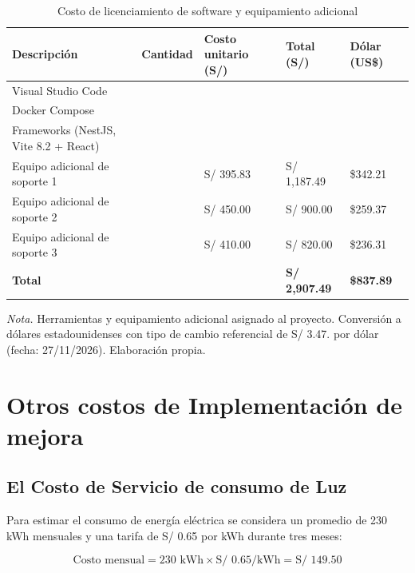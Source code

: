 \begin{table}[htbp]
\centering
\caption{Costo de licenciamiento de software y equipamiento adicional}
\label{tab:licenciamiento_adicional}
\begin{tabularx}{\textwidth}{@{}>{\raggedright\arraybackslash}X >{\centering\arraybackslash}p{1.6cm} >{\raggedleft\arraybackslash}p{2.6cm} >{\raggedleft\arraybackslash}p{2.3cm} >{\raggedleft\arraybackslash}p{2.1cm}@{}}
\toprule
\textbf{Descripción} & \textbf{Cantidad} & \textbf{Costo unitario (S/)} & \textbf{Total (S/)} & \textbf{Dólar (US\$)} \\
\midrule
Visual Studio Code & 7 & 0.00 & 0.00 & 0.00 \\
Docker Compose & 2 & 0.00 & 0.00 & 0.00 \\
Frameworks (NestJS, Vite 8.2 + React) & 7 & 0.00 & 0.00 & 0.00 \\
Equipo adicional de soporte 1 & 3 & S/ 395.83 & S/ 1,187.49 & \$342.21 \\
Equipo adicional de soporte 2 & 2 & S/ 450.00 & S/ 900.00 & \$259.37 \\
Equipo adicional de soporte 3 & 2 & S/ 410.00 & S/ 820.00 & \$236.31 \\
\midrule
\textbf{Total} & & & \textbf{S/ 2,907.49} & \textbf{\$837.89} \\
\bottomrule
\end{tabularx}
\par\vspace{0.3em}
\raggedright\footnotesize{\textit{Nota.} Herramientas y equipamiento adicional asignado al proyecto. Conversión a dólares estadounidenses con tipo de cambio referencial de S/ 3.47. por dólar (fecha: 27/11/2026). Elaboración propia.}
\end{table}

\section{Otros costos de Implementación de mejora}

\subsection{El Costo de Servicio de consumo de Luz}

Para estimar el consumo de energía eléctrica se considera un promedio de 230 kWh mensuales y una tarifa de S/ 0.65 por kWh durante tres meses:

\begin{equation*}
\text{Costo mensual} = 230\text{ kWh} \times \text{S/ 0.65/kWh} = \text{S/ 149.50}
\end{equation*}

